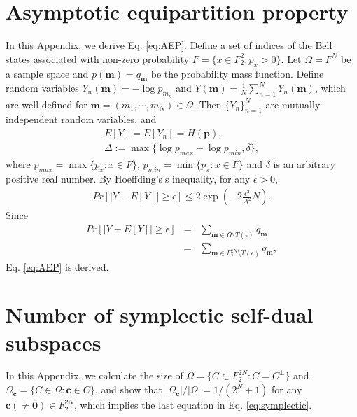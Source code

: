 \documentclass[aps,prx,twocolumn,showpacs,amsmath,notitlepage,amssymb,superscriptaddress]{revtex4-1}
\begin{document}
\section{Asymptotic equipartition property}
\label{appendix:AEP}
In this Appendix, we derive Eq. \eqref{eq:AEP}.
Define a set of indices of the Bell states associated with non-zero probability $F=\{x\in F_2^2:p_x>0\}$. Let $\Omega=F^N$ be a sample space and $p(\mathbf{m})=q_{\mathbf{m}}$ be the probability mass function. Define random variables $Y_n(\mathbf{m})=-\log p_{m_n}$ and $Y(\mathbf{m})=\frac{1}{N}\sum_{n=1}^N Y_n(\mathbf{m})$, which are well-defined for $\mathbf{m}=(m_1,\cdots,m_N)\in\Omega$. Then $\{Y_n\}_{n=1}^N$ are mutually independent random variables, and
\begin{eqnarray}
 E[Y]=E[Y_n]=H(\mathbf{p}),\\
 \Delta:=\max\{\log p_{max}-\log p_{min},\delta\},
\end{eqnarray}
where $p_{max}=\max\{p_x:x\in F\}$, $p_{min}=\min\{p_x:x\in F\}$ and $\delta$ is an arbitrary positive real number. By Hoeffding's's inequality, for any $\epsilon>0$,
\begin{eqnarray}
 Pr[|Y-E[Y]|\geq\epsilon]\leq 2\exp\left(-2\frac{\epsilon^2}{\Delta^2}N\right).
\end{eqnarray}
Since
\begin{eqnarray}
 Pr[|Y-E[Y]|\geq\epsilon]&=&\sum_{\mathbf{m}\in \Omega\setminus T(\epsilon)}q_{\mathbf{m}}\\ &=&\sum_{\mathbf{m}\in F_2^{2N}\setminus T(\epsilon)}q_{\mathbf{m}},
\end{eqnarray}
Eq. \eqref{eq:AEP} is derived.

 
\section{Number of symplectic self-dual subspaces}
\label{appendix:symplectic}
In this Appendix, we calculate the size of $\Omega=\{C\subset F_2^{2N}:C=C^{\bot}\}$ and $\Omega_{\mathbf{c}}=\{C\in \Omega:\mathbf{c}\in C\}$, and show that $|\Omega_{\mathbf{c}}|/|\Omega|=1/(2^N+1)$ for any $\mathbf{c}(\neq\mathbf{0})\in F_2^{2N}$, which implies the last equation in Eq. \eqref{eq:symplectic}.
\end{document}
